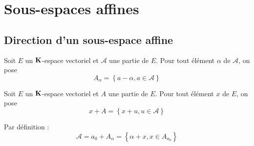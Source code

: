 

\section{Sous-espaces affines}
\subsection{Direction d'un sous-espace affine}
\begin{defi}
 Soit $E$ un $\mathbf{K}$-espace vectoriel et $\mathcal A$ une partie de $E$. Pour tout élément $\alpha$ de $\mathcal A$, on pose
\begin{displaymath}
 A_\alpha = \left\lbrace a-\alpha, a\in \mathcal A\right\rbrace 
\end{displaymath}
\end{defi}
\begin{defi}
 Soit $E$ un $\mathbf{K}$-espace vectoriel et $A$ une partie de $E$. Pour tout élément $x$ de $E$, on pose
\begin{displaymath}
 x+A = \left\lbrace x+u, u\in \mathcal A\right\rbrace 
\end{displaymath}
\end{defi}
\begin{rem}
 Par définition :
\begin{displaymath}
\mathcal A= a_0 + A_{\alpha}=\left\lbrace  \alpha +x, x\in A_{a_0}\right\rbrace 
\end{displaymath}
\end{rem}

